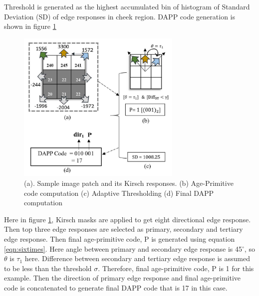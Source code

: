 \documentclass[12pt]{article}
\begin{document}

\noindent Threshold is generated as the highest accumulated bin of histogram of Standard Deviation (SD) of edge responses in cheek region. DAPP code generation is shown in figure \ref{fig:dapp_code_generation}



\begin{figure}[H]
	\begin{center}
		\centering
		\includegraphics[width=0.7\textwidth]{dapp_code_generation.png}
		\caption{(a). Sample image patch and its Kirsch responses. (b) Age-Primitive code computation (c) Adaptive Thresholding (d) Final DAPP computation}
		\label{fig:dapp_code_generation}
	\end{center}
\end{figure}


\noindent Here in figure \ref{fig:dapp_code_generation}, Kirsch masks are applied to get eight directional edge response. Then top three edge responses are selected as primary, secondary and tertiary edge response. Then final age-primitive code, P is generated using equation \ref{eqn:sixtimes}. Here angle between primary and secondary edge response is 45$^\circ$, so $\theta$ is $\tau_1$ here. Difference between secondary and tertiary edge response is assumed to be less than the threshold $\sigma$. Therefore, final age-primitive code, P is 1 for this example. Then the direction of primary edge response and final age-primitive code is concatenated to generate final DAPP code that is 17 in this case.
\end{document}
